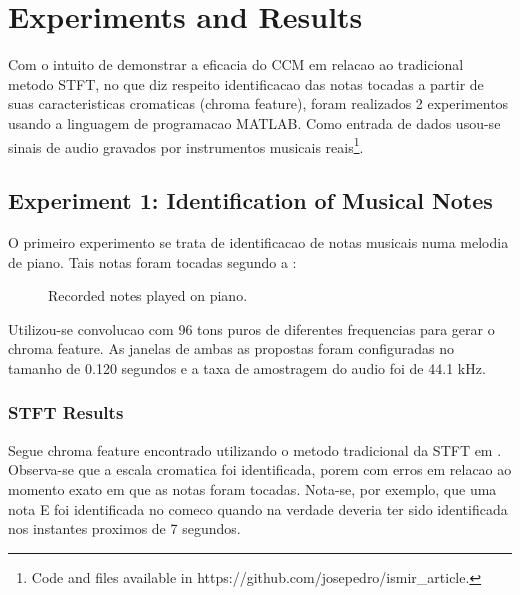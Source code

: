 \documentclass{article}
\begin{document}
\section{Experiments and Results}

	Com o intuito de demonstrar a eficacia do CCM em relacao ao tradicional metodo STFT\cite{LabROSA}, no que diz respeito identificacao das notas tocadas a partir de suas caracteristicas cromaticas (chroma feature), foram realizados 2 experimentos usando a linguagem de programacao MATLAB. Como entrada de dados usou-se sinais de audio gravados por instrumentos musicais reais\footnote{Code and files available in https://github.com/josepedro/ismir\_article.}. 

	\subsection{Experiment 1: Identification of Musical Notes}

	O primeiro experimento se trata de identificacao de notas musicais numa melodia de piano. Tais notas foram tocadas segundo a : 

	\begin{figure}[h]
	 \centerline{}
	 \caption{Recorded notes played on piano.}
	 \label{fig:1-notes}
	\end{figure}

	Utilizou-se convolucao com 96 tons puros de diferentes frequencias para gerar o chroma feature. As janelas de ambas as propostas foram configuradas no tamanho de 0.120 segundos e a taxa de amostragem do audio foi de 44.1 kHz.

	\subsubsection{STFT Results}
	Segue chroma feature encontrado utilizando o metodo tradicional da STFT em . Observa-se que a escala cromatica foi identificada, porem com erros em relacao ao momento exato em que as notas foram tocadas. Nota-se, por exemplo, que uma nota E foi identificada no comeco quando na verdade deveria ter sido identificada nos instantes proximos de 7 segundos.
\end{document}
